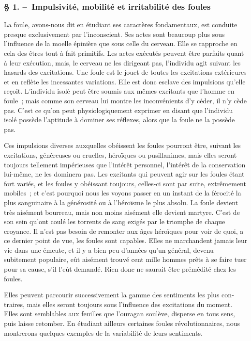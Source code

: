 \documentclass[french,twoside]{book} %
\begin{document}
\subsubsection[{§ 1. – Impulsivité, mobilité et irritabilité des foules}]{§ 1. – Impulsivité, mobilité et irritabilité des foules}
\noindent La foule, avons-nous dit en étudiant ses caractères fondamentaux, est conduite presque exclusivement par l’inconscient. Ses actes sont beaucoup plus sous l’influence de la moelle épinière que sous celle du cerveau. Elle se rapproche en cela des êtres tout à fait primitifs. Les actes exécutés peuvent être parfaits quant à leur exécution, mais, le cerveau ne les dirigeant pas, l’individu agit suivant les hasards des excita­tions. Une foule est le jouet de toutes les excitations extérieures et en reflète les incessantes variations. Elle est donc esclave des impulsions qu’elle reçoit. L’individu isolé peut être soumis aux mêmes excitants que l’homme en foule ; mais comme son cerveau lui montre les inconvénients d’y céder, il n’y cède pas. C’est ce qu’on peut physiologiquement exprimer en disant que l’individu isolé possède l’aptitude à domi­ner ses réflexes, alors que la foule ne la possède pas.\par
Ces impulsions diverses auxquelles obéissent les foules pourront être, suivant les excitations, généreuses ou cruelles, héroïques ou pusillanimes, mais elles seront toujours tellement impérieuses que l’intérêt personnel, l’intérêt de la conservation lui-même, ne les dominera pas. Les excitants qui peuvent agir sur les foules étant fort variés, et les foules y obéissant toujours, celles-ci sont par suite, extrêmement mobi­les ; et c’est pourquoi nous les voyons passer en un instant de la férocité la plus sanguinaire à la générosité ou à l’héroïsme le plus absolu. La foule devient très aisé­ment bourreau, mais non moins aisément elle devient martyre. C’est de son sein qu’ont coulé les torrents de sang exigés par le triomphe de chaque croyance. Il n’est pas besoin de remonter aux âges héroïques pour voir de quoi, a ce dernier point de vue, les foules sont capables. Elles ne marchandent jamais leur vie dans une émeute, et il y a bien peu d’années qu’un général, devenu subitement populaire, eût aisément trouvé cent mille hommes prêts à se faire tuer pour sa cause, s’il l’eût demandé. Rien donc ne saurait être prémédité chez les foules.\par
Elles peuvent parcourir successivement la gamme des sentiments les plus con­traires, mais elles seront toujours sous l’influence des excitations du moment. Elles sont semblables aux feuilles que l’ouragan soulève, disperse en tous sens, puis laisse retomber. En étudiant ailleurs certaines foules révolutionnaires, nous montrerons quelques exemples de la variabilité de leurs sentiments.\par
\end{document}
